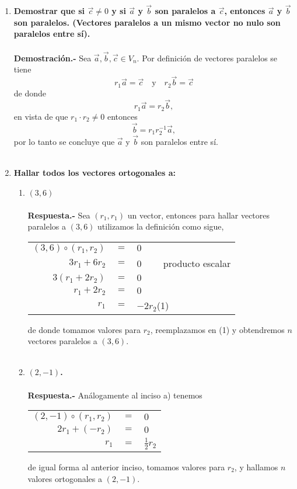 \begin{enumerate}
\begin{enumerate}[\bfseries a)]
\end{enumerate}

\item \textbf{\boldmath Demostrar que si $\vec{c}\neq 0$ y si $\vec{a}$ y $\vec{b}$ son paralelos a $\vec{c}$, entonces $\vec{a}$ y $\vec{b}$ son paralelos. (Vectores paralelos a un mismo vector no nulo son paralelos entre sí).\\\\
    Demostración.-}\; Sea $\vec{a},\vec{b},\vec{c}\in V_n$. Por definición de vectores paralelos se tiene $$r_1\vec{a}=\vec{c}\quad \mbox{y} \quad r_2\vec{b}=\vec{c}$$ de donde $$r_1\vec{a}=r_2\vec{b},$$ en vista de que $r_1\cdot r_2 \neq 0$ entonces $$\vec{b}=r_1r_2^{-1} \vec{a},$$ por lo tanto se concluye que $\vec{a}$ y $\vec{b}$ son paralelos entre sí.\\\\

\item \textbf{\boldmath Hallar todos los vectores ortogonales a:}
\begin{enumerate}[\bfseries a)]
    
    \item \textbf{\boldmath $(3,6)$\\\\
	Respuesta.-}\; Sea $(r_1,r_1)$ un vector, entonces para hallar vectores paralelos a $(3,6)$ utilizamos la definición como sigue,
	\begin{center}	
	    \begin{tabular}{rcl}
		$(3,6)\circ (r_1,r_2)$&$=$&$0$\\
		$3r_1+6r_2$&$=$&$0 \qquad$ producto escalar\\
		$3(r_1+2r_2)$&$=$&$0$\\
		$r_1+2r_2$&$=$&$0$\\
		$r_1$&$=$&$-2r_2$\qquad (1)\\
	    \end{tabular}
	\end{center}
	de donde tomamos valores para $r_2$, reemplazamos en (1) y obtendremos $n$ vectores paralelos a $(3,6)$.\\\\

    \item  \textbf{\boldmath $(2,-1)$.\\\\
	Respuesta.-}\; Análogamente al inciso a) tenemos 
	\begin{center}
	\begin{tabular}{rcl}
	    $(2,-1)\circ (r_1,r_2)$&$=$&$0$\\
	    $2r_1 + (-r_2)$&$=$&$0$\\
	    $r_1$&$=$&$\frac{1}{2}r_2$\\
	\end{tabular}
	\end{center}
	de igual forma al anterior inciso, tomamos valores para $r_2$, y hallamos $n$ valores ortogonales a $(2,-1)$.\\\\


\end{enumerate}
\end{enumerate}
